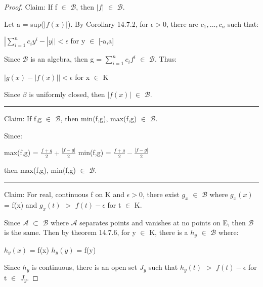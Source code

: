     \begin{proof}
        Claim: If f $\in$ $\mathscr{B}$, then $|f|$ $\in$ $\mathscr{B}$.

        Let a = sup($|f(x)|$). By {\color{orange} Corollary 14.7.2},
        for $\epsilon > 0$, there are $c_1,...,c_n$ such that:

        \hspace{0.5cm}
        $|\sum_{i=1}^n c_iy^i - |y|| < \epsilon$
        \hspace{1cm}
        for y $\in$ [-a,a]

        Since $\mathscr{B}$ is an algebra, then g = $\sum_{i=1}^n c_if^i$ $\in$
        $\mathscr{B}$. Thus:
        
        \hspace{0.5cm}
        $|g(x) - |f(x)|| < \epsilon$
        \hspace{1cm}
        for x $\in$ K

        Since $\beta$ is uniformly closed, then $|f(x)|$ $\in$ $\mathscr{B}$.

        \rule[0.1cm]{15.3cm}{0.01cm}

        Claim: If f,g $\in$ $\mathscr{B}$, then
        min(f,g), max(f,g) $\in$ $\mathscr{B}$.

        Since:

        \hspace{0.5cm}
        max(f,g) = $\frac{f+g}{2} + \frac{|f-g|}{2}$
        \hspace{1cm}
        min(f,g) = $\frac{f+g}{2} - \frac{|f-g|}{2}$

        then max(f,g), min(f,g) $\in$ $\mathscr{B}$.

        \rule[0.1cm]{15.3cm}{0.01cm}

        Claim: For real, continuous f on K and $\epsilon > 0$, there
        exist $g_x$ $\in$ $\mathscr{B}$ where $g_x(x)$ = f(x)
        and $g_x(t)$ $>$ $f(t) - \epsilon$ for t $\in$ K.

        Since $\mathscr{A}$ $\subset$ $\mathscr{B}$ where $\mathscr{A}$
        separates points and vanishes at no points on E, then $\mathscr{B}$
        is the same. Then by {\color{red} theorem 14.7.6}, for y $\in$ K,
        there is a $h_y$ $\in$ $\mathscr{B}$ where:

        \hspace{0.5cm}
        $h_y(x)$ = f(x)
        \hspace{1cm}
        $h_y(y)$ = f(y)

        Since $h_y$ is continuous, there is an open set $J_y$ such that
        $h_y(t)$ $>$ $f(t) - \epsilon$ for t $\in$ $J_y$.


\end{proof}
